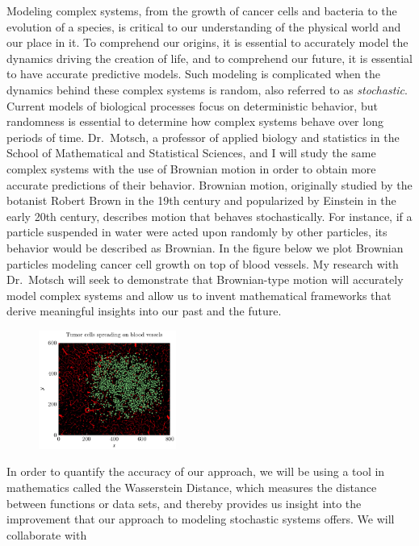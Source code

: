 \documentclass[8 pt, leqno]{article}
\begin{document}

Modeling complex systems, from the growth of cancer cells and bacteria to the evolution of a species, is critical to our understanding of the physical world and our place in it. To comprehend our origins, it is essential to accurately model the dynamics driving the creation of life, and to comprehend our future, it is essential to have accurate predictive models. Such modeling is complicated when the dynamics behind these complex systems is random, also referred to as {\it stochastic}.\\
\indent Current models of biological processes focus on  deterministic behavior, but randomness is essential to determine how complex systems behave over long periods of time. Dr.\ Motsch, a professor of applied biology and statistics in the School of Mathematical and Statistical Sciences, and I will study the same complex systems with the use of Brownian motion in order to obtain more accurate predictions of their behavior. Brownian motion, originally studied by the botanist Robert Brown in the 19th century and popularized by Einstein in the early 20th century, describes motion that behaves stochastically. For instance, if a particle suspended in water were acted upon randomly by other particles, its behavior would be described as Brownian. In the figure below we plot Brownian particles modeling cancer cell growth on top of blood vessels. My research with Dr.\ Motsch will seek to demonstrate that Brownian-type motion will accurately model complex systems and allow us to invent mathematical frameworks that derive meaningful insights into our past and the future.\\
\begin{figure}
    \includegraphics[width=0.4\textwidth]{Graph.pdf}
  \caption*{}
\end{figure} 
\indent In order to quantify the accuracy of our approach, we will be using a tool in mathematics called the Wasserstein Distance, which measures the distance between functions or data sets, and thereby provides us insight into the improvement that our approach to modeling stochastic systems offers. We will collaborate with
\end{document}
